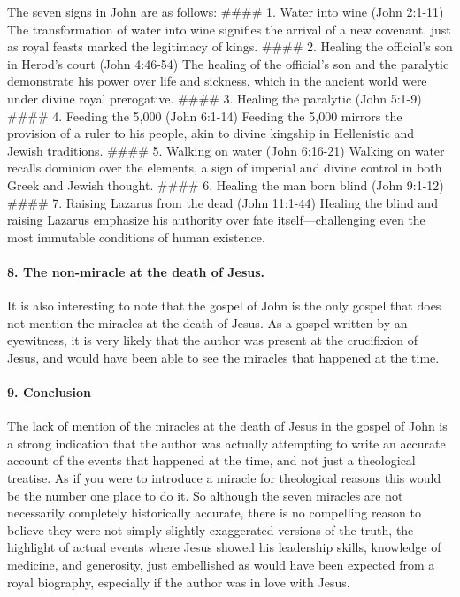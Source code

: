 The seven signs in John are as follows: \#\#\#\# 1.
Water into wine (John 2:1-11) The transformation of water into wine signifies the arrival of a new covenant, just as royal feasts marked the legitimacy of kings.
\#\#\#\# 2.
Healing the official's son in Herod's court (John 4:46-54) The healing of the official's son and the paralytic demonstrate his power over life and sickness, which in the ancient world were under divine royal prerogative.
\#\#\#\# 3.
Healing the paralytic (John 5:1-9) \#\#\#\# 4.
Feeding the 5,000 (John 6:1-14) Feeding the 5,000 mirrors the provision of a ruler to his people, akin to divine kingship in Hellenistic and Jewish traditions.
\#\#\#\# 5.
Walking on water (John 6:16-21) Walking on water recalls dominion over the elements, a sign of imperial and divine control in both Greek and Jewish thought.
\#\#\#\# 6.
Healing the man born blind (John 9:1-12) \#\#\#\# 7.
Raising Lazarus from the dead (John 11:1-44) Healing the blind and raising Lazarus emphasize his authority over fate itself---challenging even the most immutable conditions of human existence.

\paragraph{8.
The non-miracle at the death of Jesus.}\label{par:the-non-miracle-at-the-death-of-jesus.}

It is also interesting to note that the gospel of John is the only gospel that does not mention the miracles at the death of Jesus.
As a gospel written by an eyewitness, it is very likely that the author was present at the crucifixion of Jesus, and would have been able to see the miracles that happened at the time.

\paragraph{9.
Conclusion}\label{par:conclusion}

The lack of mention of the miracles at the death of Jesus in the gospel of John is a strong indication that the author was actually attempting to write an accurate account of the events that happened at the time, and not just a theological treatise.
As if you were to introduce a miracle for theological reasons this would be the number one place to do it.
So although the seven miracles are not necessarily completely historically accurate, there is no compelling reason to believe they were not simply slightly exaggerated versions of the truth, the highlight of actual events where Jesus showed his leadership skills, knowledge of medicine, and generosity, just embellished as would have been expected from a royal biography, especially if the author was in love with Jesus.

